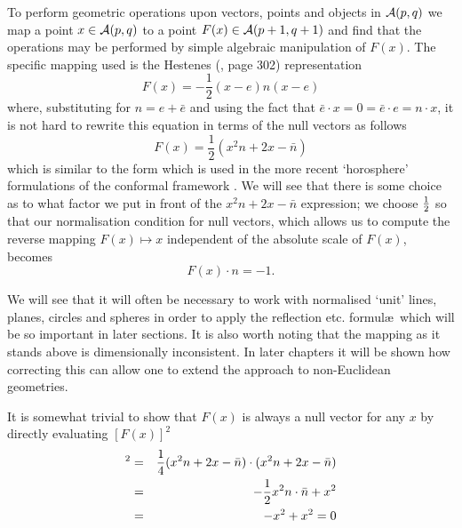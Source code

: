 To perform geometric operations upon vectors, points and objects
in $\mathcal{A}(p,q)$ we map a point $x \in \mathcal{A}(p,q)$ to a point
$F(x) \in \mathcal{A}(p+1,q+1)$ and find that the operations may be performed
by simple algebraic manipulation of $F(x)$. The specific mapping
used is the Hestenes (\cite{HS84}, page 302) representation
%
\begin{equation}
F(x)=-\frac{1}{2}(x-e)n(x-e)
\end{equation}
%
where, substituting for $n=e+\bar{e}$ and using the fact that
$\bar{e}\cdot x = 0 = \bar{e}\cdot e = n\cdot x$, it is not
hard to rewrite this equation in terms of the null
vectors as follows
%
\begin{equation}
  F(x) = \frac{1}{2}(x^2n + 2x - \bar{n})
\end{equation}
%
which is similar to the form which is used in the more recent
`horosphere' formulations of the conformal framework
\cite{oldwine}. We will see that there is some choice as
to what factor we put in front of the $x^2n + 2x -
\bar{n}$ expression; we choose $\frac{1}{2}$ so that our
normalisation condition for null vectors, which allows us to
compute the reverse mapping $F(x) \mapsto x$ independent of the
absolute scale of $F(x)$, becomes
%
\[ F(x)\cdot n = -1.  \]
%

We will see that it will often be necessary to work with
normalised `unit' lines, planes, circles and spheres in order to
apply the reflection etc. formul\ae\ which will be so
important in later sections. It is also worth noting that the
mapping as it stands above is dimensionally inconsistent. In later
chapters it will be shown how correcting this can allow
one to extend the approach to non-Euclidean geometries.

It is somewhat trivial to show that $F(x)$ is always a null vector for
any $x$ by directly evaluating $[F(x)]^2$
%
\begin{eqnarray}
 [F(x)]^2 & = &  \frac{1}{4}(x^2n + 2x - \bar{n})\cdot (x^2n + 2x - \bar{n}) \nn \\
              & = & -\frac{1}{2}x^2 n\cdot \bar{n} + x^2  \nn \\
              & = &  -x^2 + x^2 = 0
\end{eqnarray}
%

